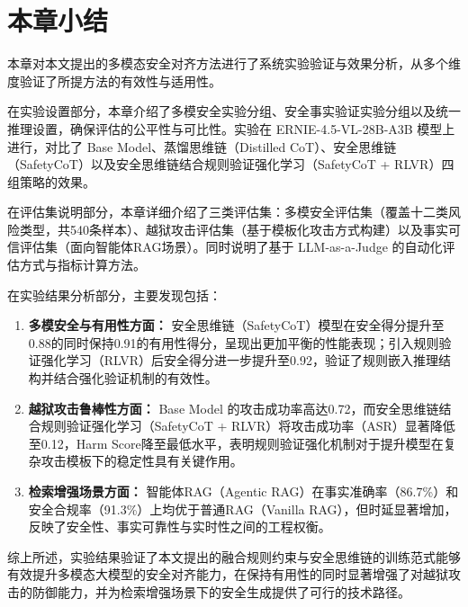 \section{本章小结}

本章对本文提出的多模态安全对齐方法进行了系统实验验证与效果分析，从多个维度验证了所提方法的有效性与适用性。

在实验设置部分，本章介绍了多模安全实验分组、安全事实验证实验分组以及统一推理设置，确保评估的公平性与可比性。实验在 ERNIE-4.5-VL-28B-A3B 模型上进行，对比了 Base Model、蒸馏思维链（Distilled CoT）、安全思维链（SafetyCoT）以及安全思维链结合规则验证强化学习（SafetyCoT + RLVR）四组策略的效果。

在评估集说明部分，本章详细介绍了三类评估集：多模安全评估集（覆盖十二类风险类型，共540条样本）、越狱攻击评估集（基于模板化攻击方式构建）以及事实可信评估集（面向智能体RAG场景）。同时说明了基于 LLM-as-a-Judge 的自动化评估方式与指标计算方法。

在实验结果分析部分，主要发现包括：
\begin{enumerate}
    \item \textbf{多模安全与有用性方面：} 安全思维链（SafetyCoT）模型在安全得分提升至0.88的同时保持0.91的有用性得分，呈现出更加平衡的性能表现；引入规则验证强化学习（RLVR）后安全得分进一步提升至0.92，验证了规则嵌入推理结构并结合强化验证机制的有效性。
    
    \item \textbf{越狱攻击鲁棒性方面：} Base Model 的攻击成功率高达0.72，而安全思维链结合规则验证强化学习（SafetyCoT + RLVR）将攻击成功率（ASR）显著降低至0.12，Harm Score降至最低水平，表明规则验证强化机制对于提升模型在复杂攻击模板下的稳定性具有关键作用。
    
    \item \textbf{检索增强场景方面：} 智能体RAG（Agentic RAG）在事实准确率（86.7\%）和安全合规率（91.3\%）上均优于普通RAG（Vanilla RAG），但时延显著增加，反映了安全性、事实可靠性与实时性之间的工程权衡。
\end{enumerate}

综上所述，实验结果验证了本文提出的融合规则约束与安全思维链的训练范式能够有效提升多模态大模型的安全对齐能力，在保持有用性的同时显著增强了对越狱攻击的防御能力，并为检索增强场景下的安全生成提供了可行的技术路径。
